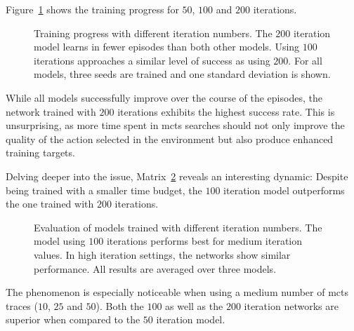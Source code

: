 Figure~\ref{fig:iter_success_shaded} shows the training progress for $50$, $100$ and $200$ iterations.
\begin{figure}[h]
	\centering
	\captionsetup{justification=centering}
	\scalebox{0.9}{
    
    }
	\caption[Training plots for different iterations]{Training progress with different iteration numbers. The $200$ iteration model learns in fewer episodes than both other models. Using $100$ iterations approaches a similar level of success as using $200$. For all models, three seeds are trained and one standard deviation is shown.}
\label{fig:iter_success_shaded}
\end{figure}
While all models successfully improve over the course of the episodes, the network trained with $200$ iterations exhibits the highest success rate. This is unsurprising, as more time spent in \gls{mcts} searches should not only improve the quality of the action selected in the environment but also produce enhanced training targets.

Delving deeper into the issue, Matrix~\ref{fig:iter_success_matrix} reveals an interesting dynamic: Despite being trained with a smaller time budget, the $100$ iteration model outperforms the one trained with $200$ iterations.
\begin{figure}[h]
	\centering
	\captionsetup{justification=centering}
	\scalebox{0.6}{
    
    }
	\caption[Evaluation results for different iterations]{Evaluation of models trained with different iteration numbers. The model using $100$ iterations performs best for medium iteration values. In high iteration settings, the networks show similar performance. All results are averaged over three models.}
\label{fig:iter_success_matrix}
\end{figure}
The phenomenon is especially noticeable when using a medium number of \gls{mcts} traces ($10$, $25$ and $50$). Both the $100$ as well as the $200$ iteration networks are superior when compared to the $50$ iteration model.

